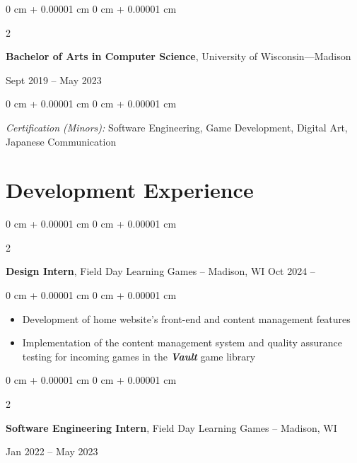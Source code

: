 \documentclass[10pt, letterpaper]{article}
\newenvironment{highlights}{
    \begin{itemize}[
        topsep=0.10 cm,
        parsep=0.10 cm,
        partopsep=0pt,
        itemsep=0pt,
        leftmargin=0 cm + 10pt
    ]
}{
    \end{itemize}
} %
\newenvironment{onecolentry}{
    \begin{adjustwidth}{
        0 cm + 0.00001 cm
    }{
        0 cm + 0.00001 cm
    }
}{
    \end{adjustwidth}
} %
\newenvironment{twocolentry}[2][]{
    \onecolentry
    \def\secondColumn{#2}
    \setcolumnwidth{\fill, 4.5 cm}
    \begin{paracol}{2}
}{
    \switchcolumn \raggedleft \secondColumn
    \end{paracol}
    \endonecolentry
} %
\begin{document}
        \vspace{0.2 cm}

        \begin{twocolentry}{
            Sept 2019 – May 2023
        }
        \textbf{Bachelor of Arts in Computer Science}, University of Wisconsin—Madison
        \end{twocolentry}
        \begin{onecolentry}
            \begin{highlights}
                \textit{Certification (Minors):} Software Engineering, Game Development, Digital Art, Japanese Communication
            \end{highlights}
        \end{onecolentry}

    \section{Development Experience}

        \begin{twocolentry}{
            Oct 2024 – 
        }
            \textbf{Design Intern}, Field Day Learning Games -- Madison, WI\end{twocolentry}

        \vspace{0.10 cm}
        \begin{onecolentry}
            \begin{highlights}
                \item Development of home website's front-end and content management features
                \item Implementation of the content management system and quality assurance testing for incoming games in the \textbf{\textit{Vault}} game library
            \end{highlights}
        \end{onecolentry}

        \vspace{0.2 cm}

        \begin{twocolentry}{
            Jan 2022 – May 2023
        }
            \textbf{Software Engineering Intern}, Field Day Learning Games -- Madison, WI
        \end{twocolentry}
\end{document}
